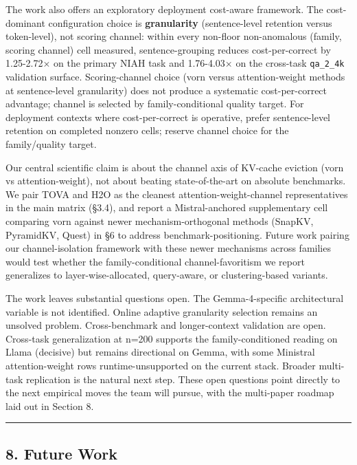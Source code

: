 \documentclass[
]{article}
\begin{document}
The work also offers an exploratory deployment cost-aware framework. The
cost-dominant configuration choice is \textbf{granularity}
(sentence-level retention versus token-level), not scoring channel:
within every non-floor non-anomalous (family, scoring channel) cell
measured, sentence-grouping reduces cost-per-correct by 1.25-2.72× on
the primary NIAH task and 1.76-4.03× on the cross-task
\texttt{qa\_2\_4k} validation surface. Scoring-channel choice (vorn
versus attention-weight methods at sentence-level granularity) does not
produce a systematic cost-per-correct advantage; channel is selected by
family-conditional quality target. For deployment contexts where
cost-per-correct is operative, prefer sentence-level retention on
completed nonzero cells; reserve channel choice for the family/quality
target.

Our central scientific claim is about the channel axis of KV-cache
eviction (vorn vs attention-weight), not about beating
state-of-the-art on absolute benchmarks. We pair TOVA and
H2O as the cleanest attention-weight-channel representatives in
the main matrix (§3.4), and report a Mistral-anchored supplementary cell
comparing vorn against newer mechanism-orthogonal methods (SnapKV,
PyramidKV, Quest) in §6 to address benchmark-positioning. Future work
pairing our channel-isolation framework with these newer mechanisms
across families would test whether the family-conditional
channel-favoritism we report generalizes to layer-wise-allocated,
query-aware, or clustering-based variants.

The work leaves substantial questions open. The Gemma-4-specific
architectural variable is not identified. Online adaptive granularity
selection remains an unsolved problem. Cross-benchmark and
longer-context validation are open. Cross-task generalization at n=200
supports the family-conditioned reading on Llama (decisive) but remains
directional on Gemma, with some Ministral attention-weight rows
runtime-unsupported on the current stack. Broader multi-task replication
is the natural next step. These open questions point directly to the
next empirical moves the team will pursue, with the multi-paper roadmap
laid out in Section 8.

\begin{center}\rule{0.5\linewidth}{0.5pt}\end{center}

\subsection{8. Future Work}\label{8-future-work}
\end{document}

